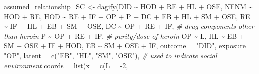 \documentclass[
]{article}
\newenvironment{Shaded}{\begin{snugshade}}{\end{snugshade}}
\newcommand{\AttributeTok}[1]{\textcolor[rgb]{0.77,0.63,0.00}{#1}}
\newcommand{\CommentTok}[1]{\textcolor[rgb]{0.56,0.35,0.01}{\textit{#1}}}
\newcommand{\DecValTok}[1]{\textcolor[rgb]{0.00,0.00,0.81}{#1}}
\newcommand{\FunctionTok}[1]{\textcolor[rgb]{0.00,0.00,0.00}{#1}}
\newcommand{\NormalTok}[1]{#1}
\newcommand{\OtherTok}[1]{\textcolor[rgb]{0.56,0.35,0.01}{#1}}
\newcommand{\SpecialCharTok}[1]{\textcolor[rgb]{0.00,0.00,0.00}{#1}}
\newcommand{\StringTok}[1]{\textcolor[rgb]{0.31,0.60,0.02}{#1}}
\begin{document}
\begin{Shaded}
\begin{Highlighting}[]
\NormalTok{assumed\_relationship\_SC }\OtherTok{\textless{}{-}} \FunctionTok{dagify}\NormalTok{(DID }\SpecialCharTok{\textasciitilde{}}\NormalTok{ HOD }\SpecialCharTok{+}\NormalTok{ RE }\SpecialCharTok{+}\NormalTok{ HL }\SpecialCharTok{+}\NormalTok{ OSE,}
\NormalTok{                                          NFNM }\SpecialCharTok{\textasciitilde{}}\NormalTok{ HOD }\SpecialCharTok{+}\NormalTok{ RE,}
\NormalTok{                                          HOD }\SpecialCharTok{\textasciitilde{}}\NormalTok{ RE }\SpecialCharTok{+}\NormalTok{ IF }\SpecialCharTok{+}\NormalTok{ OP }\SpecialCharTok{+}\NormalTok{ P }\SpecialCharTok{+}\NormalTok{ DC }\SpecialCharTok{+}\NormalTok{ EB }\SpecialCharTok{+}\NormalTok{ HL }\SpecialCharTok{+}\NormalTok{ SM }\SpecialCharTok{+}\NormalTok{ OSE,}
\NormalTok{                                          RE }\SpecialCharTok{\textasciitilde{}}\NormalTok{ IF }\SpecialCharTok{+}\NormalTok{ HL }\SpecialCharTok{+}\NormalTok{ EB }\SpecialCharTok{+}\NormalTok{ SM }\SpecialCharTok{+}\NormalTok{ OSE,}
\NormalTok{                                          DC }\SpecialCharTok{\textasciitilde{}}\NormalTok{ OP }\SpecialCharTok{+}\NormalTok{ RE }\SpecialCharTok{+}\NormalTok{ IF, }\CommentTok{\# drug components other than heroin}
\NormalTok{                                          P }\SpecialCharTok{\textasciitilde{}}\NormalTok{ OP }\SpecialCharTok{+}\NormalTok{ RE }\SpecialCharTok{+}\NormalTok{ IF, }\CommentTok{\# purity/dose of heroin}
\NormalTok{                                          OP }\SpecialCharTok{\textasciitilde{}}\NormalTok{ L,}
\NormalTok{                                          HL }\SpecialCharTok{\textasciitilde{}}\NormalTok{ EB }\SpecialCharTok{+}\NormalTok{ SM }\SpecialCharTok{+}\NormalTok{ OSE }\SpecialCharTok{+}\NormalTok{ IF }\SpecialCharTok{+}\NormalTok{ HOD,}
\NormalTok{                                          EB }\SpecialCharTok{\textasciitilde{}}\NormalTok{ SM }\SpecialCharTok{+}\NormalTok{ OSE }\SpecialCharTok{+}\NormalTok{ IF,}
                                          \AttributeTok{outcome =} \StringTok{"DID"}\NormalTok{,}
                                          \AttributeTok{exposure =} \StringTok{"OP"}\NormalTok{,}
                                          \AttributeTok{latent =} \FunctionTok{c}\NormalTok{(}\StringTok{"EB"}\NormalTok{, }\StringTok{"HL"}\NormalTok{, }\StringTok{"SM"}\NormalTok{, }\StringTok{"OSE"}\NormalTok{),  }\CommentTok{\# used to indicate social environment}
                                          \AttributeTok{coords =} \FunctionTok{list}\NormalTok{(}\AttributeTok{x =} \FunctionTok{c}\NormalTok{(}\AttributeTok{L =} \SpecialCharTok{{-}}\DecValTok{2}\NormalTok{,}

\end{Highlighting}
\end{Shaded}
\end{document}
